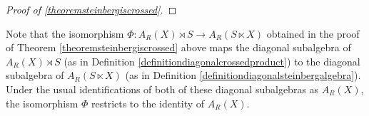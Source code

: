 \begin{proof}[Proof of \ref{theoremsteinbergiscrossed}]
\end{proof}

\begin{remarkn}\label{remarkdiagonalsubalgebras}
Note that the isomorphism $\Phi:A_R(X)\rtimes S\to A_R(S\ltimes X)$ obtained in the proof of Theorem \ref{theoremsteinbergiscrossed} above maps the diagonal subalgebra of $A_R(X)\rtimes S$ (as in Definition \ref{definitiondiagonalcrossedproduct}) to the diagonal subalgebra of $A_R(S\ltimes X)$ (as in Definition \ref{definitiondiagonalsteinbergalgebra}). Under the usual identifications of both of these diagonal subalgebras as $A_R(X)$, the isomorphism $\Phi$ restricts to the identity of $A_R(X)$.
\end{remarkn}

